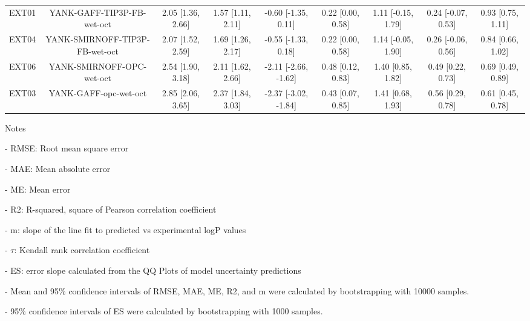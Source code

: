 \documentclass{article}
\begin{document}
\begin{center}
\begin{longtable}{|ccccccccc|}
 EXT01 &      YANK-GAFF-TIP3P-FB-wet-oct &  2.05 [1.36, 2.66] &  1.57 [1.11, 2.11] &   -0.60 [-1.35, 0.11] &  0.22 [0.00, 0.58] &  1.11 [-0.15, 1.79] &  0.24 [-0.07, 0.53] &  0.93 [0.75, 1.11] \\
 EXT04 &  YANK-SMIRNOFF-TIP3P-FB-wet-oct &  2.07 [1.52, 2.59] &  1.69 [1.26, 2.17] &   -0.55 [-1.33, 0.18] &  0.22 [0.00, 0.58] &  1.14 [-0.05, 1.90] &  0.26 [-0.06, 0.56] &  0.84 [0.66, 1.02] \\
 EXT06 &       YANK-SMIRNOFF-OPC-wet-oct &  2.54 [1.90, 3.18] &  2.11 [1.62, 2.66] &  -2.11 [-2.66, -1.62] &  0.48 [0.12, 0.83] &   1.40 [0.85, 1.82] &   0.49 [0.22, 0.73] &  0.69 [0.49, 0.89] \\
 EXT03 &           YANK-GAFF-opc-wet-oct &  2.85 [2.06, 3.65] &  2.37 [1.84, 3.03] &  -2.37 [-3.02, -1.84] &  0.43 [0.07, 0.85] &   1.41 [0.68, 1.93] &   0.56 [0.29, 0.78] &  0.61 [0.45, 0.78] \\
\end{longtable}
\end{center}

Notes

- RMSE: Root mean square error

- MAE: Mean absolute error

- ME: Mean error

- R2: R-squared, square of Pearson correlation coefficient

- m: slope of the line fit to predicted vs experimental logP values

- $\tau$:  Kendall rank correlation coefficient

- ES: error slope calculated from the QQ Plots of model uncertainty predictions

- Mean and 95\% confidence intervals of RMSE, MAE, ME, R2, and m were calculated by bootstrapping with 10000 samples.

- 95\% confidence intervals of ES were calculated by bootstrapping with 1000 samples.\end{document}
\end{document}
